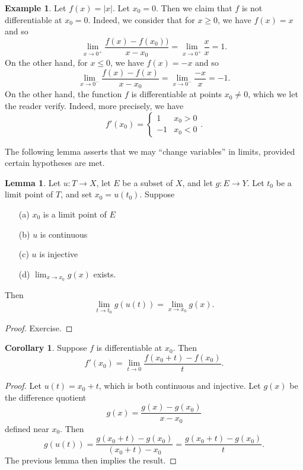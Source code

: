\documentclass[12pt]{article}
\theoremstyle{definition}
\newtheorem{example}[definition]{Example}
\theoremstyle{theorem}
\newtheorem{corollary}[definition]{Corollary}
\newtheorem{lemma}[definition]{Lemma}
\begin{document}
\begin{example}
Let $f(x) = |x|$. Let $x_0 = 0$. Then we claim that $f$ is not differentiable at $x_0 = 0$. Indeed, we consider that for $x \geqslant 0$, we have $f(x) = x$ and so 
\[
\lim_{x \to 0^+} \frac{f(x) - f(x_0))}{x - x_0} = \lim_{x \to 0^+}\frac{x}{x} = 1.
\]
On the other hand, for $x \leqslant 0$, we have $f(x) = -x$ and so 
\[
\lim_{x \to 0^-}\frac{f(x) - f(x)}{x - x_0} = \lim_{x \to 0^-}\frac{-x}{x} = -1.
\]
On the other hand, the function $f$ is differentiable at points $x_0 \ne 0$, which we let the reader verify. Indeed, more precisely, we have 
\[
f'(x_0) = \begin{cases}
1 & x_0 > 0 \\
-1 & x_0 < 0
\end{cases}.
\] 
\end{example}

The following lemma asserts that we may ``change variables'' in limits, provided certain hypotheses are met. 

\begin{lemma}
Let $u : T \to X$, let $E$ be a subset of $X$, and let $g : E \to Y$. Let $t_0$ be a limit point of $T$, and set $x_0 = u(t_0)$. Suppose 
\begin{enumerate}
\item[(a)] $x_0$ is a limit point of $E$
\item[(b)] $u$ is continuous 
\item[(c)] $u$ is injective
\item[(d)] $\lim_{x \to x_0}g(x)$ exists.
\end{enumerate}
Then 
\[
\lim_{t \to t_0}g(u(t)) = \lim_{x \to x_0}g(x). 
\]
\end{lemma}

\begin{proof}
Exercise. 
\end{proof}

\begin{corollary}
Suppose $f$ is differentiable at $x_0$. Then 
\[
f'(x_0) = \lim_{t \to 0} \frac{f(x_0 + t) - f(x_0)}{t}.
\]
\end{corollary}

\begin{proof}
Let $u(t) = x_0 + t$, which is both continuous and injective. Let $g(x)$ be the difference quotient 
\[
g(x) = \frac{g(x) - g(x_0)}{x - x_0}
\]
defined near $x_0$. Then 
\[
g(u(t)) = \frac{g(x_0 + t) - g(x_0)}{(x_0 + t) - x_0} = \frac{g(x_0 + t) - g(x_0)}{t}.
\]
The previous lemma then implies the result. 
\end{proof}
\end{document}
